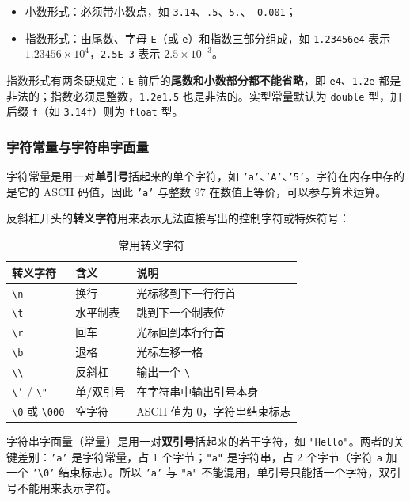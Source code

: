 \begin{itemize}
  \item 小数形式：必须带小数点，如 \texttt{3.14}、\texttt{.5}、\texttt{5.}、\texttt{-0.001}；
  \item 指数形式：由尾数、字母 \texttt{E}（或 \texttt{e}）和指数三部分组成，如 \texttt{1.23456e4} 表示 $1.23456\times10^{4}$，\texttt{2.5E-3} 表示 $2.5\times10^{-3}$。
\end{itemize}

指数形式有两条硬规定：\texttt{E} 前后的\textbf{尾数和小数部分都不能省略}，即 \texttt{e4}、\texttt{1.2e} 都是非法的；指数必须是整数，\texttt{1.2e1.5} 也是非法的。实型常量默认为 \texttt{double} 型，加后缀 \texttt{f}（如 \texttt{3.14f}）则为 \texttt{float} 型。

\subsubsection{字符常量与字符串字面量}

字符常量是用一对\textbf{单引号}括起来的单个字符，如 \texttt{'a'}、\texttt{'A'}、\texttt{'5'}。字符在内存中存的是它的 ASCII 码值，因此 \texttt{'a'} 与整数 97 在数值上等价，可以参与算术运算。

反斜杠开头的\textbf{转义字符}用来表示无法直接写出的控制字符或特殊符号：

\begin{table}[htbp]
\centering
\caption{常用转义字符}
\small
\begin{tabularx}{\textwidth}{@{}llX@{}}
\toprule
转义字符 & 含义 & 说明 \\
\midrule
\texttt{\textbackslash n} & 换行 & 光标移到下一行行首 \\
\texttt{\textbackslash t} & 水平制表 & 跳到下一个制表位 \\
\texttt{\textbackslash r} & 回车 & 光标回到本行行首 \\
\texttt{\textbackslash b} & 退格 & 光标左移一格 \\
\texttt{\textbackslash\textbackslash} & 反斜杠 & 输出一个 \texttt{\textbackslash} \\
\texttt{\textbackslash'} / \texttt{\textbackslash"} & 单/双引号 & 在字符串中输出引号本身 \\
\texttt{\textbackslash 0} 或 \texttt{\textbackslash 000} & 空字符 & ASCII 值为 0，字符串结束标志 \\
\bottomrule
\end{tabularx}
\end{table}

字符串字面量（常量）是用一对\textbf{双引号}括起来的若干字符，如 \texttt{"Hello"}。两者的关键差别：\texttt{'a'} 是字符常量，占 1 个字节；\texttt{"a"} 是字符串，占 2 个字节（字符 \texttt{a} 加一个 \texttt{'\textbackslash 0'} 结束标志）。所以 \texttt{'a'} 与 \texttt{"a"} 不能混用，单引号只能括一个字符，双引号不能用来表示字符。

